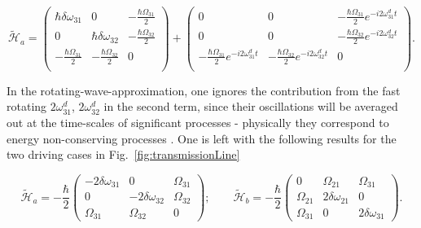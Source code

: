   \begin{equation}
	  \widetilde{\mathcal{H}}_{a} = \begin{pmatrix}
	  \hbar\delta\omega_{31} & 0 & -\frac{\hbar\Omega_{31}}{2}\\  0 & \hbar\delta\omega_{32} & -\frac{\hbar\Omega_{32}}{2} \\   	-\frac{\hbar\Omega_{31}}{2} & -\frac{\hbar\Omega_{32}}{2} & 0 \\
	  \end{pmatrix} + \begin{pmatrix}
	  0 & 0 & -\frac{\hbar\Omega_{31}}{2}e^{-i2\omega^{d}_{31}t}\\  0 & 0 & -\frac{\hbar\Omega_{32}}{2}e^{-i2\omega^{d}_{32}t}  \\   	-\frac{\hbar\Omega_{31}}{2}e^{-i2\omega^{d}_{31}t} & -\frac{\hbar\Omega_{32}}{2}e^{-i2\omega^{d}_{32}t} & 0 \\
	  \end{pmatrix}.
	  \label{rawTransformedFinal}
  \end{equation}
  
  \noindent In the rotating-wave-approximation, one ignores the contribution from the fast rotating $ 2\omega^{d}_{31} $, $ 2\omega^{d}_{32} $ in the second term, since their oscillations will be averaged out at the time-scales of significant processes - physically they correspond to energy non-conserving processes \cite{ioChunHoi}. One is left with the following results for the two driving cases in Fig.~\ref{fig:transmissionLine}
  
  \begin{equation}
  \label{rwaHamitlonianApprox}
  \widetilde{\mathcal{H}}_{a} = -\frac{\hbar}{2}\begin{pmatrix}
  -2\delta\omega_{31} & 0 & \Omega_{31}\\  0 & -2\delta\omega_{32} & \Omega_{32} \\   	\Omega_{31} & \Omega_{32} & 0
  \end{pmatrix};\qquad\widetilde{\mathcal{H}}_{b} = -\frac{\hbar}{2}\begin{pmatrix}
  0 & \Omega_{21} & \Omega_{31}\\  \Omega_{21} & 2\delta\omega_{21} & 0 \\   	\Omega_{31} & 0 & 2\delta\omega_{31}\end{pmatrix}.
  \end{equation}
  
